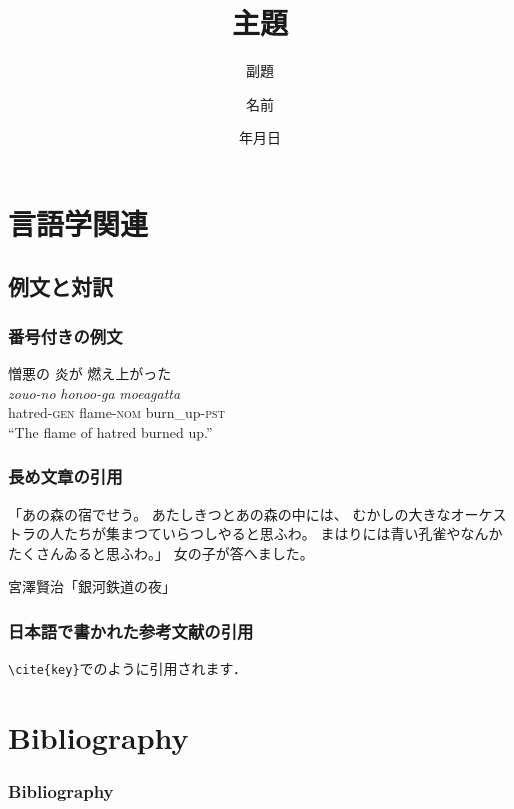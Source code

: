 \documentclass[11pt]{beamer}
\title{主題}
\subtitle{副題}
\institute{所属}
\author{名前}
\date{{\number\year}年{\number\month}月{\number\day}日}
\begin{document}
\begin{frame}
    \nocite{demo}
    \maketitle
\end{frame}

\section{言語学関連}
\subsection{例文と対訳}
\begin{frame}
\frametitle{番号付きの例文}
    \begin{exe}
        \ex%
        \glll%
        {憎悪の} {炎が} {燃え上がった} \\
        {\textit{zouo-no}} {\textit{honoo-ga}} {\textit{moeagatta}} \\
        {hatred-\textsc{gen}} {flame-\textsc{nom}} {burn\_up-\textsc{pst}} \\
        \trans%
        ``The flame of hatred burned up.''
    \end{exe}
\end{frame}

\begin{frame}
    \frametitle{長め文章の引用}
    \begin{leftbar}
        「あの森の宿でせう。
        あたしきつとあの森の中には、
        むかしの大きなオーケストラの人たちが集まつていらつしやると思ふわ。
        まはりには青い孔雀やなんかたくさんゐると思ふわ。」
        女の子が答へました。

        \hfill 宮澤賢治「銀河鉄道の夜」
    \end{leftbar}
\end{frame}

\begin{frame}
\frametitle{日本語で書かれた参考文献の引用}
\texttt{{\textbackslash}cite\{key\}}で\cite{demo}のように引用されます．
\end{frame}

\section{Bibliography}
\begin{frame}
\frametitle{Bibliography}
\footnotesize


\end{frame}
\end{document}
